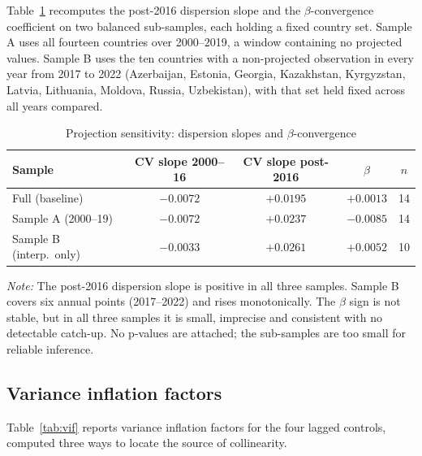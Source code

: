 Table~\ref{tab:proj-check} recomputes the post-2016 dispersion slope and the $\beta$-convergence coefficient on two balanced sub-samples, each holding a fixed country set. Sample A uses all fourteen countries over 2000--2019, a window containing no projected values. Sample B uses the ten countries with a non-projected observation in every year from 2017 to 2022 (Azerbaijan, Estonia, Georgia, Kazakhstan, Kyrgyzstan, Latvia, Lithuania, Moldova, Russia, Uzbekistan), with that set held fixed across all years compared.

\begin{table}[htbp]
\centering
\caption{Projection sensitivity: dispersion slopes and $\beta$-convergence}
\label{tab:proj-check}
\small
\begin{tabular}{lcccc}
\toprule
Sample & CV slope 2000--16 & CV slope post-2016 & $\beta$ & $n$ \\
\midrule
Full (baseline) & $-0.0072$ & $+0.0195$ & $+0.0013$ & 14 \\
Sample A (2000--19) & $-0.0072$ & $+0.0237$ & $-0.0085$ & 14 \\
Sample B (interp.\ only) & $-0.0033$ & $+0.0261$ & $+0.0052$ & 10 \\
\bottomrule
\end{tabular}

\begin{minipage}{\textwidth}\footnotesize
\vspace{4pt}
\emph{Note:} The post-2016 dispersion slope is positive in all three samples. Sample B covers six annual points (2017--2022) and rises monotonically. The $\beta$ sign is not stable, but in all three samples it is small, imprecise and consistent with no detectable catch-up. No p-values are attached; the sub-samples are too small for reliable inference.
\end{minipage}
\end{table}

\subsection{Variance inflation factors}
\label{app:vif}

Table~\ref{tab:vif} reports variance inflation factors for the four lagged controls, computed three ways to locate the source of collinearity.

